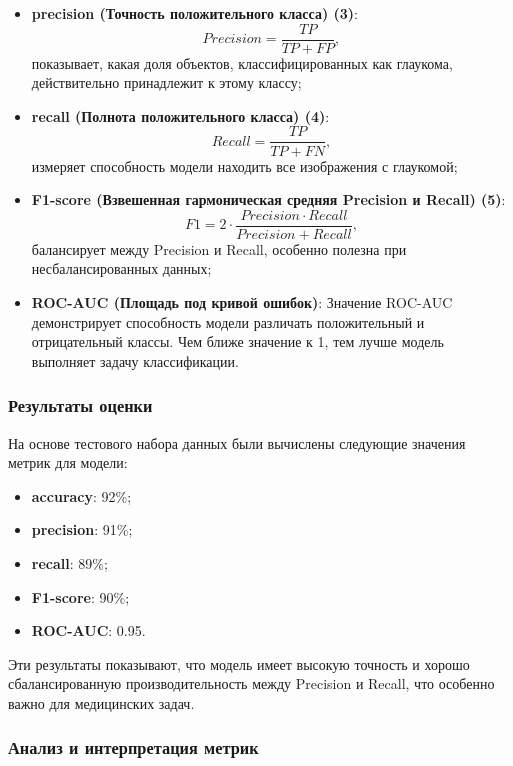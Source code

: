 {\begin{itemize}
        \item \textbf{precision (Точность положительного класса) (3)}:
        \[
        Precision = \frac{TP}{TP + FP}, \tag{3}
        \]
        показывает, какая доля объектов, классифицированных как глаукома, действительно принадлежит к этому классу;

        \item \textbf{recall (Полнота положительного класса) (4)}:
        \[
        Recall = \frac{TP}{TP + FN}, \tag{4}
        \]
        измеряет способность модели находить все изображения с глаукомой;

        \item \textbf{F1-score (Взвешенная гармоническая средняя Precision и Recall) (5)}:
        \[
        F1 = 2 \cdot \frac{Precision \cdot Recall}{Precision + Recall}, \tag{5}
        \]
        балансирует между Precision и Recall, особенно полезна при несбалансированных данных;

        \item \textbf{ROC-AUC (Площадь под кривой ошибок)}:
        Значение ROC-AUC демонстрирует способность модели различать положительный и отрицательный классы. Чем ближе значение к 1, тем лучше модель выполняет задачу классификации.
    \end{itemize}

    \subsubsection*{Результаты оценки}

    На основе тестового набора данных были вычислены следующие значения метрик для модели:

    \begin{itemize}
        \item \textbf{accuracy}: 92\%;
        \item \textbf{precision}: 91\%;
        \item \textbf{recall}: 89\%;
        \item \textbf{F1-score}: 90\%;
        \item \textbf{ROC-AUC}: 0.95.
    \end{itemize}

    Эти результаты показывают, что модель имеет высокую точность и хорошо сбалансированную производительность между Precision и Recall, что особенно важно для медицинских задач.

    \subsubsection*{Анализ и интерпретация метрик}

}
